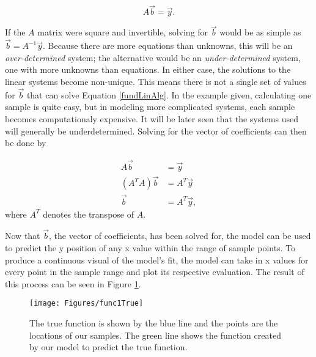 \begin{equation} \label{fundLinAlg}
A\vec{b} = \vec{y}.
\end{equation}

\par If the $A$ matrix were square and invertible, solving for $\vec{b}$ would be as simple as $\vec{b} = A^{-1}\vec{y}$. Because there are more equations than unknowns, this will be an \textit{over-determined} system; the alternative would be an \textit{under-determined} system, one with more unknowns than equations. In either case, the solutions to the linear systems become non-unique. This means there is not a single set of values for $\vec{b}$ that can solve Equation \ref{fundLinAlg}. In the example given, calculating one sample is quite easy, but in modeling more complicated systems, each sample becomes computationaly expensive. It will be later seen that the systems used will generally be underdetermined. Solving for the vector of coefficients can then be done by 

\begin{align}
A\vec{b} &= \vec{y} \\
(A^TA)\vec{b} &= A^T\vec{y} \\
\vec{b} &= A^T\vec{y},
\end{align}
where $A^T$ denotes the transpose of $A$.

\par Now that $\vec{b}$, the vector of coefficients, has been solved for, the model can be used to predict the y position of any x value within the range of sample points. To produce a continuous visual of the model's fit, the model can take in x values for every point in the sample range and plot its respective evaluation. The result of this process can be seen in Figure \ref{figFunc1True}.

\begin{figure}[h]
\texttt{[image: Figures/func1True]}
\caption{The true function is shown by the blue line and the points are the locations of our samples. The green line shows the function created by our model to predict the true function.
\label{figFunc1True}} 
\end{figure}



